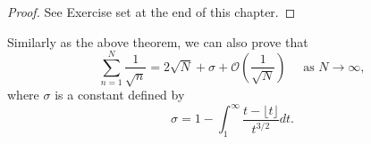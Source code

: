 \documentclass{elegantbook}
\begin{document}
\begin{proof}
  See Exercise set at the end of this chapter.
\end{proof}

\begin{theorem} \label{thm:asymptotic_formula_for_partial_sums_of_square_root_function}
  Similarly as the above theorem, we can also prove that
  \[
    \sum_{n=1}^N \frac{1}{\sqrt{n}} = 2\sqrt{N} + \sigma + \mathcal{O}\left( \frac{1}{\sqrt{N}} \right) \quad \text{ as } N \to \infty,
  \]
  where $\sigma$ is a constant defined by
  \[
    \sigma = 1 - \int_1^{\infty} \frac{t-\lfloor t \rfloor}{t^{3/2}} dt.
  \]
\end{theorem}

%
%
\end{document}
